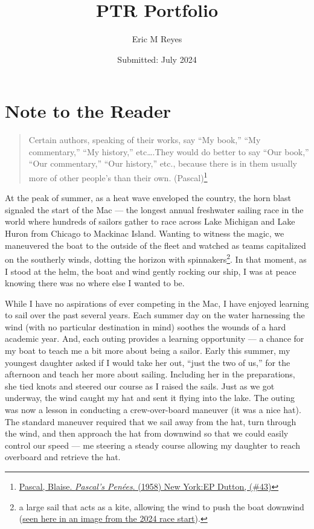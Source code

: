 \documentclass[
  letterpaper,
  DIV=11,
  numbers=noendperiod]{scrreprt}
\title{PTR Portfolio}
\author{Eric M Reyes}
\date{Submitted: July 2024}
\renewcommand*\contentsname{Table of contents}
\newcommand\contentsname{Table of contents}
\begin{document}
\maketitle

\renewcommand*\contentsname{Table of contents}
{
\hypersetup{linkcolor=}
\setcounter{tocdepth}{2}
\tableofcontents
}

\chapter*{Note to the Reader}\label{note-to-the-reader}


\begin{quote}
Certain authors, speaking of their works, say ``My book,'' ``My
commentary,'' ``My history,'' etc\ldots.They would do better to say
``Our book,'' ``Our commentary,'' ``Our history,'' etc., because there
is in them usually more of other people's than their own.
(Pascal)\footnote{\href{https://www.gutenberg.org/files/18269/18269-h/18269-h.htm\#p_43}{Pascal,
  Blaise. \emph{Pascal's Penées}. (1958) New York:EP Dutton, (\#43)}}
\end{quote}

At the peak of summer, as a heat wave enveloped the country, the horn
blast signaled the start of the Mac --- the longest annual freshwater
sailing race in the world where hundreds of sailors gather to race
across Lake Michigan and Lake Huron from Chicago to Mackinac Island.
Wanting to witness the magic, we maneuvered the boat to the outside of
the fleet and watched as teams capitalized on the southerly winds,
dotting the horizon with spinnakers\footnote{a large sail that acts as a
  kite, allowing the wind to push the boat downwind
  (\href{https://drive.google.com/file/d/1NrW5GJNlNJxoZi73NggF7sHlc6oJlpdx/view?usp=sharing}{seen
  here in an image from the 2024 race start}).}. In that moment, as I
stood at the helm, the boat and wind gently rocking our ship, I was at
peace knowing there was no where else I wanted to be.

While I have no aspirations of ever competing in the Mac, I have enjoyed
learning to sail over the past several years. Each summer day on the
water harnessing the wind (with no particular destination in mind)
soothes the wounds of a hard academic year. And, each outing provides a
learning opportunity --- a chance for my boat to teach me a bit more
about being a sailor. Early this summer, my youngest daughter asked if I
would take her out, ``just the two of us,'' for the afternoon and teach
her more about sailing. Including her in the preparations, she tied
knots and steered our course as I raised the sails. Just as we got
underway, the wind caught my hat and sent it flying into the lake. The
outing was now a lesson in conducting a crew-over-board maneuver (it was
a nice hat). The standard maneuver required that we sail away from the
hat, turn through the wind, and then approach the hat from downwind so
that we could easily control our speed --- me steering a steady course
allowing my daughter to reach overboard and retrieve the hat.
\end{document}
